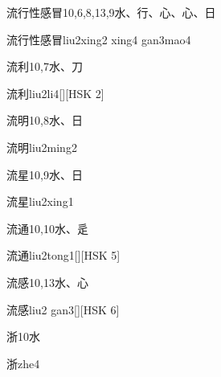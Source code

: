 \begin{Entry}{流行性感冒}{10,6,8,13,9}{⽔、⾏、⼼、⼼、⽇}
  \begin{Phonetics}{流行性感冒}{liu2xing2 xing4 gan3mao4}
  \end{Phonetics}
\end{Entry}

\begin{Entry}{流利}{10,7}{⽔、⼑}
  \begin{Phonetics}{流利}{liu2li4}[][HSK 2]
  \end{Phonetics}
\end{Entry}

\begin{Entry}{流明}{10,8}{⽔、⽇}
  \begin{Phonetics}{流明}{liu2ming2}
  \end{Phonetics}
\end{Entry}

\begin{Entry}{流星}{10,9}{⽔、⽇}
  \begin{Phonetics}{流星}{liu2xing1}
  \end{Phonetics}
\end{Entry}

\begin{Entry}{流通}{10,10}{⽔、⾡}
  \begin{Phonetics}{流通}{liu2tong1}[][HSK 5]
  \end{Phonetics}
\end{Entry}

\begin{Entry}{流感}{10,13}{⽔、⼼}
  \begin{Phonetics}{流感}{liu2 gan3}[][HSK 6]
  \end{Phonetics}
\end{Entry}

\begin{Entry}{浙}{10}{⽔}
  \begin{Phonetics}{浙}{zhe4}
  \end{Phonetics}
\end{Entry}

